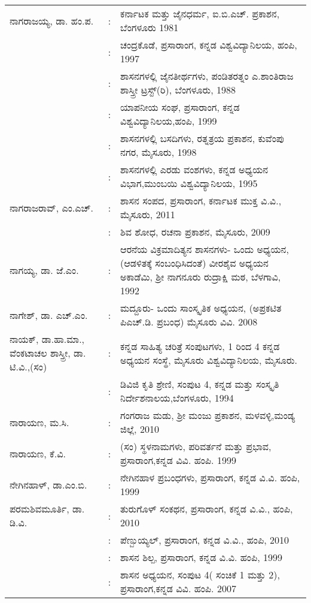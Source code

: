 \begin{longtable}[l]{@{}>{\raggedright}p{4.7cm}cp{9.2cm}<{\raggedright}@{}}
ನಾಗರಾಜಯ್ಯ, ಡಾ. ಹಂ.ಪ. & : &  ಕರ್ನಾಟಕ ಮತ್ತು ಜೈನಧರ್ಮ, ಐ.ಬಿ.ಎಚ್​. ಪ್ರಕಾಶನ, ಬೆಂಗಳೂರು 1981\\[2pt]
& : & ಚಂದ್ರಕೊಡೆ, ಪ್ರಸಾರಾಂಗ, ಕನ್ನಡ ವಿಶ್ವವಿದ್ಯಾನಿಲಯ, ಹಂಪಿ, 1997\\[2pt]
& : & ಶಾಸನಗಳಲ್ಲಿ ಜೈನತೀರ್ಥಗಳು, ಪಂಡಿತರತ್ನಂ ಎ.ಶಾಂತಿರಾಜ ಶಾಸ್ತ್ರೀ ಟ್ರಸ್ಟ್​(ರಿ), ಬೆಂಗಳೂರು, 1988\\[2pt]
& : & ಯಾಪನೀಯ ಸಂಘ, ಪ್ರಸಾರಾಂಗ, ಕನ್ನಡ ವಿಶ್ವವಿದ್ಯಾನಿಲಯ,\newline ಹಂಪಿ, 1999\\[2pt]
& : & ಶಾಸನಗಳಲ್ಲಿ ಬಸದಿಗಳು, ರತ್ನತ್ರಯ ಪ್ರಕಾಶನ, ಕುವೆಂಪು ನಗರ, ಮೈಸೂರು, 1998\\[2pt]
& : & ಶಾಸನಗಳಲ್ಲಿ ಎರಡು ವಂಶಗಳು, ಕನ್ನಡ ಅಧ್ಯಯನ ವಿಭಾಗ,\newline ಮುಂಬಯಿ ವಿಶ್ವವಿದ್ಯಾನಿಲಯ, 1995\\[2pt]
ನಾಗರಾಜರಾವ್​, ಎಂ.ಎಚ್​. & : &  ಶಾಸನ ಸಂಪದ, ಪ್ರಸಾರಾಂಗ, ಕರ್ನಾಟಕ ಮುಕ್ತ ವಿ.ವಿ., ಮೈಸೂರು, 2011\\
& : & ಶಿವ ಶೋಧ, ರಚನಾ ಪ್ರಕಾಶನ, ಮೈಸೂರು, 2009\\
ನಾಗಯ್ಯ, ಡಾ. ಜೆ.ಎಂ. & : & ಆರನೆಯ ವಿಕ್ರಮಾದಿತ್ಯನ ಶಾಸನಗಳು- ಒಂದು ಅಧ್ಯಯನ, (ಆಡಳಿತಕ್ಕೆ ಸಂಬಂಧಿಸಿದಂತೆ) ವೀರಶೈವ ಅಧ್ಯಯನ ಅಕಾಡೆಮಿ, ಶ‍್ರೀ ನಾಗನೂರು ರುದ್ರಾಕ್ಷಿ ಮಠ, ಬೆಳಗಾವಿ, 1992\\
ನಾಗೇಶ್​, ಡಾ. ಎಚ್​.ಎಂ. & : &  ಮದ್ದೂರು- ಒಂದು ಸಾಂಸ್ಕೃತಿಕ ಅಧ್ಯಯನ, (ಅಪ್ರಕಟಿತ ಪಿಎಚ್​.ಡಿ. ಪ್ರಬಂಧ) ಮೈಸೂರು ವಿವಿ. 2008\\
ನಾಯಕ್​, ಡಾ.ಹಾ.ಮಾ., ವೆಂಕಟಾಚಲ ಶಾಸ್ತ್ರೀ, ಡಾ. ಟಿ.ವಿ.,(ಸಂ) & : &  ಕನ್ನಡ ಸಾಹಿತ್ಯ ಚರಿತ್ರೆ ಸಂಪುಟಗಳು, 1 ರಿಂದ 4 ಕನ್ನಡ ಅಧ್ಯಯನ ಸಂಸ್ಥೆ, ಮೈಸೂರು ವಿಶ್ವವಿದ್ಯಾನಿಲಯ, ಮೈಸೂರು.\\[-12pt]
& : & ಡಿವಿಜಿ ಕೃತಿ ಶ್ರೇಣಿ, ಸಂಪುಟ 4, ಕನ್ನಡ ಮತ್ತು ಸಂಸ್ಕೃತಿ ನಿರ್ದೇಶನಾಲಯ,\newline ಬೆಂಗಳೂರು, 1994\\
ನಾರಾಯಣ, ಮ.ಸಿ. & : &  ಗಂಗರಾಜ ಮಡು, ಶ‍್ರೀ ಮಂಜು ಪ್ರಕಾಶನ, ಮಳವಳ್ಳಿ,\newline ಮಂಡ್ಯ ಜಿಲ್ಲೆ, 2010\\
ನಾರಾಯಣ, ಕೆ.ವಿ. & : & (ಸಂ) ಸ್ಥಳನಾಮಗಳು, ಪರಿವರ್ತನೆ ಮತ್ತು ಪ್ರಭಾವ, ಪ್ರಸಾರಾಂಗ,\newline ಕನ್ನಡ ವಿವಿ. ಹಂಪಿ. 1999\\
ನೇಗಿನಹಾಳ್​, ಡಾ.ಎಂ.ಬಿ. & : &  ನೇಗಿನಹಾಳ ಪ್ರಬಂಧಗಳು, ಪ್ರಸಾರಾಂಗ, ಕನ್ನಡ ವಿ.ವಿ. ಹಂಪಿ, 1999\\
ಪರಮಶಿವಮೂರ್ತಿ, ಡಾ. ಡಿ.ವಿ. & : & ತುರುಗೊಳ್​ ಸಂಕಥನ, ಪ್ರಸಾರಾಂಗ, ಕನ್ನಡ ವಿ.ವಿ., ಹಂಪಿ, 2010\\
& : & ಪೆಣ್ಬುಯ್ಯಲ್​, ಪ್ರಸಾರಾಂಗ, ಕನ್ನಡ ವಿ.ವಿ., ಹಂಪಿ, 2010\\
& : & ಶಾಸನ ಶಿಲ್ಪ, ಪ್ರಸಾರಾಂಗ, ಕನ್ನಡ ವಿ.ವಿ. ಹಂಪಿ, 1999\\
& : & ಶಾಸನ ಅಧ್ಯಯನ, ಸಂಪುಟ 4( ಸಂಚಿಕೆ 1 ಮತ್ತು 2), ಪ್ರಸಾರಾಂಗ,\newline ಕನ್ನಡ ವಿವಿ. ಹಂಪಿ. 2007\\

\end{longtable}
